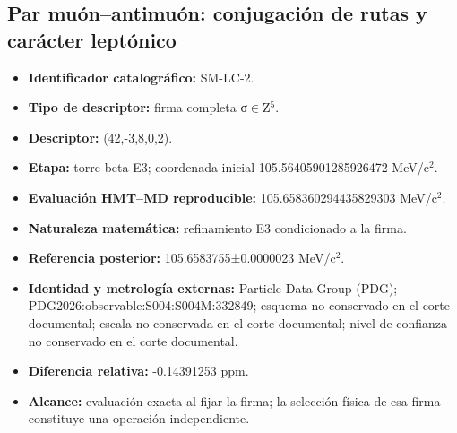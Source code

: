 \subsection{Par muón–antimuón: conjugación de rutas y carácter leptónico}
\begin{itemize}
\item \textbf{Identificador catalográfico:} SM-LC-2.
\item \textbf{Tipo de descriptor:} firma completa σ\(\in\)Z\({}^{5}\).
\item \textbf{Descriptor:} (42,-3,8,0,2).
\item \textbf{Etapa:} torre beta E3; coordenada inicial 105.564059\allowbreak{}012859\allowbreak{}26472 MeV/c\({}^{2}\).
\item \textbf{Evaluación HMT--MD reproducible:} 105.658360\allowbreak{}294435\allowbreak{}829303 MeV/c\({}^{2}\).
\item \textbf{Naturaleza matemática:} refinamiento E3 condicionado a la firma.
\item \textbf{Referencia posterior:} 105.658375\allowbreak{}5±\allowbreak{}0.000002\allowbreak{}3 MeV/c\({}^{2}\).
\item \textbf{Identidad y metrología externas:} Particle Data Group (PDG); PDG2026:\allowbreak{}observable:\allowbreak{}S004:\allowbreak{}S004M:\allowbreak{}332849; esquema no conservado en el corte documental; escala no conservada en el corte documental; nivel de confianza no conservado en el corte documental.
\item \textbf{Diferencia relativa:} -0.143912\allowbreak{}53 ppm.
\item \textbf{Alcance:} evaluación exacta al fijar la firma; la selección física de esa firma constituye una operación independiente.
\end{itemize}
